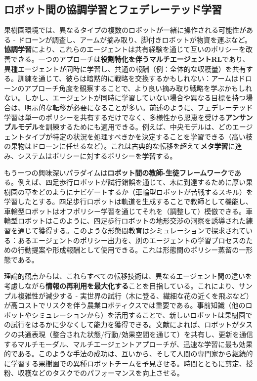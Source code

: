 \documentclass[a4paper,fleqn,10pt,twocolumn]{template_v1.0}
\begin{document}
\subsection{ロボット間の協調学習とフェデレーテッド学習}
果樹園環境では、異なるタイプの複数のロボットが一緒に操作される可能性がある - ドローンが調査し、アームが摘み取り、脚付きロボットが物資を運ぶなど。\textbf{協調学習}により、これらのエージェントは共有経験を通じて互いのポリシーを改善できる。一つのアプローチは\textbf{役割特化を伴うマルチエージェントRL}であり、異種エージェントが同時に学習し、共通の報酬（例：全体的な収穫量）を共有する。訓練を通じて、彼らは暗黙的に戦略を交換するかもしれない：アームはドローンのアプローチ角度を観察することで、より良い摘み取り戦略を学ぶかもしれない。しかし、エージェントが同時に学習していない場合や異なる目標を持つ場合は、明示的な転移が必要になることが多い。前述のように、フェデレーテッド学習は単一のポリシーを共有するだけでなく、多様性から恩恵を受ける\textbf{アンサンブルモデル}を訓練するためにも適用できる。例えば、中央モデルは、どのエージェントタイプが特定の状況を処理すべきかを決定することを学習できる（高い枝の果物はドローンに任せるなど）。これは古典的な転移を超えて\textbf{メタ学習}に進み、システムはポリシーに対するポリシーを学習する。

もう一つの興味深いパラダイムは\textbf{ロボット間の教師-生徒フレームワーク}である。例えば、四足歩行ロボットが試行錯誤を通じて、木に到達するために厚い果樹園の草をどのようにナビゲートするか（車輪型ロボットが苦戦するスキル）を学習したとする。四足歩行ロボットは軌道を生成することで教師として機能し、車輪型ロボットはオフポリシー学習を通じてそれを（調整して）模倣できる。車輪型ロボットはこのように、四足歩行ロボットの地形交渉の洞察を誘導された練習を通じて獲得する。このような形態間教育はシミュレーションで探求されている：あるエージェントのポリシー出力を、別のエージェントの学習プロセスのための行動提案や形成報酬として使用できる\cite{Taylor2009}。これは形態間のポリシー蒸留の一形態である。

理論的観点からは、これらすべての転移技術は、異なるエージェント間の違いを考慮しながら\textbf{情報の再利用を最大化する}ことを目指している。これにより、サンプル複雑性が減少する - 実世界の試行（木に登る、繊細な花の近くを飛ぶなど）が高コストでリスクを伴う農業ロボティクスでは重要である。事前知識（他のロボットやシミュレーションから）を活用することで、新しいロボットは果樹園での試行をはるかに少なくして能力を獲得できる。文献によれば、ロボットがタスクの共通表現（整合された状態/行動/効果空間を通じて）を共有し、更新を通信するマルチモーダル、マルチエージェントアプローチが、迅速な学習に最も効果的である\cite{Jiang2023}\cite{Jiang2023a}。このような手法の成功は、互いから、そして人間の専門家から継続的に学習する果樹園での異種ロボットチームを予見させる。時間とともに剪定、授粉、収穫などのタスクでのパフォーマンスを向上させる。
\end{document}

